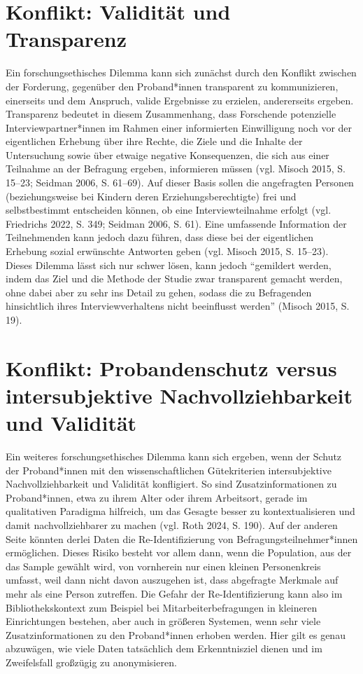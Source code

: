 \documentclass[a4paper,
fontsize=11pt,
oneside,
numbers=noperiodatend,
parskip=half-,
bibliography=totoc,
final
]{scrartcl}
\begin{document}
\section{Konflikt: Validität und
Transparenz}\label{konflikt-validituxe4t-und-transparenz}

Ein forschungsethisches Dilemma kann sich zunächst durch den Konflikt
zwischen der Forderung, gegenüber den Proband*innen transparent zu
kommunizieren, einerseits und dem Anspruch, valide Ergebnisse zu
erzielen, andererseits ergeben. Transparenz bedeutet in diesem
Zusammenhang, dass Forschende potenzielle Interviewpartner*innen im
Rahmen einer informierten Einwilligung noch vor der eigentlichen
Erhebung über ihre Rechte, die Ziele und die Inhalte der Untersuchung
sowie über etwaige negative Konsequenzen, die sich aus einer Teilnahme
an der Befragung ergeben, informieren müssen (vgl. Misoch 2015, S.
15--23; Seidman 2006, S. 61--69). Auf dieser Basis sollen die
angefragten Personen (beziehungsweise bei Kindern deren
Erziehungsberechtigte) frei und selbstbestimmt entscheiden können, ob
eine Interviewteilnahme erfolgt (vgl. Friedrichs 2022, S. 349; Seidman
2006, S. 61). Eine umfassende Information der Teilnehmenden kann jedoch
dazu führen, dass diese bei der eigentlichen Erhebung sozial erwünschte
Antworten geben (vgl. Misoch 2015, S. 15--23). Dieses Dilemma lässt sich
nur schwer lösen, kann jedoch \enquote{gemildert werden, indem das Ziel
und die Methode der Studie zwar transparent gemacht werden, ohne dabei
aber zu sehr ins Detail zu gehen, sodass die zu Befragenden hinsichtlich
ihres Interviewverhaltens nicht beeinflusst werden} (Misoch 2015, S.
19).

\section{Konflikt: Probandenschutz versus intersubjektive
Nachvollziehbarkeit und
Validität}\label{konflikt-probandenschutz-versus-intersubjektive-nachvollziehbarkeit-und-validituxe4t}

Ein weiteres forschungsethisches Dilemma kann sich ergeben, wenn der
Schutz der Proband*in\-nen mit den wissenschaftlichen Gütekriterien
intersubjektive Nachvollziehbarkeit und Validität konfligiert. So sind
Zusatzinformationen zu Proband*innen, etwa zu ihrem Alter oder ihrem
Arbeitsort, gerade im qualitativen Paradigma hilfreich, um das Gesagte
besser zu kontextualisieren und damit nachvollziehbarer zu machen (vgl.
Roth 2024, S. 190). Auf der anderen Seite könnten derlei Daten die
Re-Identifizierung von Befragungsteilnehmer*innen ermöglichen. Dieses
Risiko besteht vor allem dann, wenn die Population, aus der das Sample
gewählt wird, von vornherein nur einen kleinen Personenkreis umfasst,
weil dann nicht davon auszugehen ist, dass abgefragte Merkmale auf mehr
als eine Person zutreffen. Die Gefahr der Re-Identifizierung kann also
im Bibliothekskontext zum Beispiel bei Mitarbeiterbefragungen in
kleineren Einrichtungen bestehen, aber auch in größeren Systemen, wenn
sehr viele Zusatzinformationen zu den Proband*innen erhoben werden. Hier
gilt es genau abzuwägen, wie viele Daten tatsächlich dem Erkenntnisziel
dienen und im Zweifelsfall großzügig zu anonymisieren.
\end{document}
